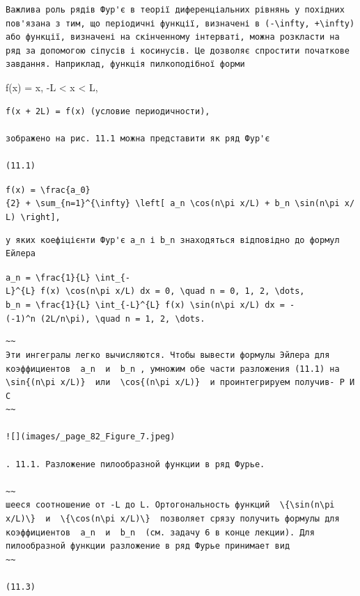 \documentclass[
  ukrainian,
]{article}
\begin{document}
\begin{verbatim}
Важлива роль рядів Фур'є в теорії диференціальних рівнянь у похідних пов'язана з тим, що періодичні функції, визначені в (-\infty, +\infty) або функції, визначені на скінченному інтерваті, можна розкласти на ряд за допомогою сіпусів і косинусів. Це дозволяє спростити початкове завдання. Наприклад, функція пилкоподібної форми
\end{verbatim}

f(x) = x, -L \textless{} x \textless{} L,

\begin{verbatim}
f(x + 2L) = f(x) (условие периодичности),

зображено на рис. 11.1 можна представити як ряд Фур'є

(11.1)
\end{verbatim}

\texttt{f(x)\ =\ \textbackslash{}frac\{a\_0\}\{2\}\ +\ \textbackslash{}sum\_\{n=1\}\^{}\{\textbackslash{}infty\}\ \textbackslash{}left{[}\ a\_n\ \textbackslash{}cos(n\textbackslash{}pi\ x/L)\ +\ b\_n\ \textbackslash{}sin(n\textbackslash{}pi\ x/L)\ \textbackslash{}right{]},}

\begin{verbatim}
у яких коефіцієнти Фур'є a_n і b_n знаходяться відповідно до формул Ейлера
\end{verbatim}

\texttt{a\_n\ =\ \textbackslash{}frac\{1\}\{L\}\ \textbackslash{}int\_\{-L\}\^{}\{L\}\ f(x)\ \textbackslash{}cos(n\textbackslash{}pi\ x/L)\ dx\ =\ 0,\ \textbackslash{}quad\ n\ =\ 0,\ 1,\ 2,\ \textbackslash{}dots,}
\texttt{b\_n\ =\ \textbackslash{}frac\{1\}\{L\}\ \textbackslash{}int\_\{-L\}\^{}\{L\}\ f(x)\ \textbackslash{}sin(n\textbackslash{}pi\ x/L)\ dx\ =\ -(-1)\^{}n\ (2L/n\textbackslash{}pi),\ \textbackslash{}quad\ n\ =\ 1,\ 2,\ \textbackslash{}dots.}

\begin{verbatim}
~~
Эти ингегралы легко вычисляются. Чтобы вывести формулы Эйлера для коэффициентов  a_n  и  b_n , умножим обе части разложения (11.1) на  \sin{(n\pi x/L)}  или  \cos{(n\pi x/L)}  и проинтегрируем получив- Р И С
~~

![](images/_page_82_Figure_7.jpeg)

. 11.1. Разложение пилообразной функции в ряд Фурье.

~~
шееся соотношение от -L до L. Ортогональность функций  \{\sin(n\pi x/L)\}  и  \{\cos(n\pi x/L)\}  позволяет срязу получить формулы для коэффициентов  a_n  и  b_n  (см. задачу 6 в конце лекции). Для пилообразной функции разложение в ряд Фурье принимает вид
~~

(11.3)
\end{verbatim}
\end{document}
